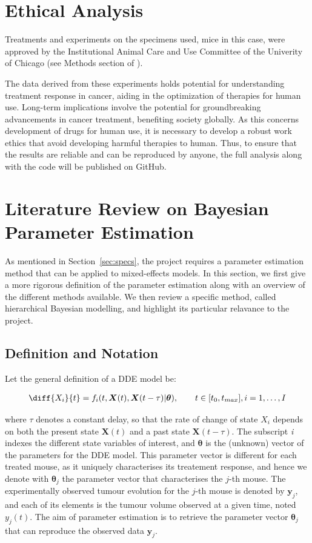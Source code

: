 \documentclass[11pt]{article}
\begin{document}
\section{Ethical Analysis}

Treatments and experiments on the specimens used, mice in this case, were approved by the Institutional Animal Care and Use Committee of the Univerity of Chicago (see Methods section of \cite{cbdil12}).

The data derived from these experiments holds potential for understanding treatment response in cancer, aiding in the optimization of therapies for human use. Long-term implications involve the potential for groundbreaking advancements in cancer treatment, benefiting society globally. As this concerns development of drugs for human use, it is necessary to develop a robust work ethics that avoid developing harmful therapies to human. Thus, to ensure that the results are reliable and can be reproduced by anyone, the full analysis along with the code will be published on GitHub.

\section{Literature Review on Bayesian Parameter Estimation}\label{sec:littrev}

As mentioned in Section~\ref{sec:specs}, the project requires a parameter estimation method that can be applied to mixed-effects models. In this section, we first give a more rigorous definition of the parameter estimation along with an overview of the different methods available. We then review a specific method, called hierarchical Bayesian modelling, and highlight its particular relavance to the project. 

\subsection{Definition and Notation}
Let the general definition of a DDE model be: 

\begin{align*}
    \diff{X_i}{t} = f_i(t, \boldsymbol{X}(t), \boldsymbol{X}(t-\tau)| \boldsymbol{\theta}), \qquad t \in [t_0, t_{max}], i = 1, \ldots, I
\end{align*}

where $\tau$ denotes a constant delay, so that the rate of change of state $X_i$ depends on both the present state $\boldsymbol{X}(t)$ and a past state $\boldsymbol{X}(t-\tau)$. The subscript \textit{i} indexes the different state variables of interest, and $\boldsymbol{\theta}$ is the (unknown) vector of the parameters for the DDE model. This parameter vector is different for each treated mouse, as it uniquely characterises its treatement response, and hence we denote with $\boldsymbol{\theta}_j$ the parameter vector that characterises the $j$-th mouse. The experimentally observed tumour evolution for the $j$-th mouse is denoted by $\boldsymbol{y}_j$, and each of its elements is the tumour volume observed at a given time, noted $y_{j}(t)$. The aim of parameter estimation is to retrieve the parameter vector $\boldsymbol{\theta}_j$ that can reproduce the observed data $\boldsymbol{y}_j$. 
\end{document}
